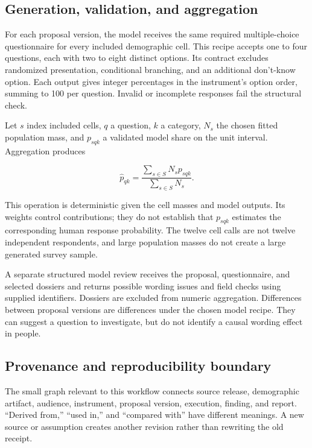 \documentclass[
  11pt,
]{article}
\begin{document}
\subsection{Generation, validation, and
aggregation}\label{generation-validation-and-aggregation}

For each proposal version, the model receives the same required
multiple-choice questionnaire for every included demographic cell. This
recipe accepts one to four questions, each with two to eight distinct
options. Its contract excludes randomized presentation, conditional
branching, and an additional don't-know option. Each output gives
integer percentages in the instrument's option order, summing to 100 per
question. Invalid or incomplete responses fail the structural check.

Let \(s\) index included cells, \(q\) a question, \(k\) a category,
\(N_s\) the chosen fitted population mass, and \(p_{sqk}\) a validated
model share on the unit interval. Aggregation produces

\[
\widehat{p}_{qk}=\frac{\sum_{s\in S}N_s p_{sqk}}{\sum_{s\in S}N_s}.
\]

This operation is deterministic given the cell masses and model outputs.
Its weights control contributions; they do not establish that
\(p_{sqk}\) estimates the corresponding human response probability. The
twelve cell calls are not twelve independent respondents, and large
population masses do not create a large generated survey sample.

A separate structured model review receives the proposal, questionnaire,
and selected dossiers and returns possible wording issues and field
checks using supplied identifiers. Dossiers are excluded from numeric
aggregation. Differences between proposal versions are differences under
the chosen model recipe. They can suggest a question to investigate, but
do not identify a causal wording effect in people.

\subsection{Provenance and reproducibility
boundary}\label{provenance-and-reproducibility-boundary}

The small graph relevant to this workflow connects source release,
demographic artifact, audience, instrument, proposal version, execution,
finding, and report. ``Derived from,'' ``used in,'' and ``compared
with'' have different meanings. A new source or assumption creates
another revision rather than rewriting the old receipt.
\end{document}
